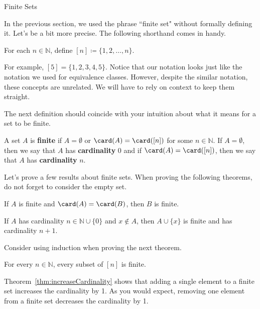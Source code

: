 \begin{section}{Finite Sets}

In the previous section, we used the phrase ``finite set" without formally defining it. Let's be a bit more precise. The following shorthand comes in handy.

\begin{definition}
For each $n\in \mathbb{N}$, define $\boxed{[n]\coloneqq \{1,2,\ldots,n\}}$.
\end{definition}

For example, $[5]=\{1,2,3,4,5\}$.  Notice that our notation looks just like the notation we used for equivalence classes. However, despite the similar notation, these concepts are unrelated. We will have to rely on context to keep them straight.

The next definition should coincide with your intuition about what it means for a set to be finite.

\begin{definition}
A set $A$ is \textbf{finite} if $A=\emptyset$ or $\card(A)=\card([n])$ for some $n\in\mathbb{N}$. If $A=\emptyset$, then we say that $A$ has \textbf{cardinality} 0 and if $\card(A)=\card([n])$, then we say that $A$ has \textbf{cardinality} $n$.
\end{definition}

Let's prove a few results about finite sets. When proving the following theorems, do not forget to consider the empty set.

\begin{theorem}\label{thm:finiteSetsSameCardinality}
If $A$ is finite and $\card(A)=\card(B)$, then $B$ is finite.
\end{theorem}

\begin{theorem}\label{thm:increaseCardinality}
If $A$ has cardinality $n\in\mathbb{N}\cup\{0\}$ and $x\notin A$, then $A\cup\{x\}$ is finite and has cardinality $n+1$.
\end{theorem}

Consider using induction when proving the next theorem.

\begin{theorem}\label{thm:subsetsFiniteSets}
For every $n\in\mathbb{N}$, every subset of $[n]$ is finite.
\end{theorem}

Theorem~\ref{thm:increaseCardinality} shows that adding a single element to a finite set increases the cardinality by 1. As you would expect, removing one element from a finite set decreases the cardinality by 1.


\end{section}
